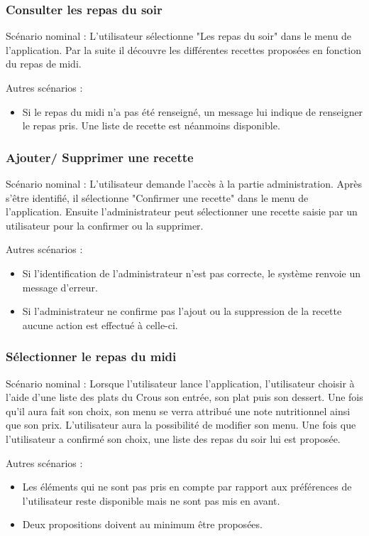 \subsubsection{Consulter les repas du soir} 

Scénario nominal :
L'utilisateur sélectionne "Les repas du soir" dans le menu de l'application. Par la suite il découvre les différentes recettes proposées en fonction du repas de midi.

Autres scénarios :
\begin{itemize}
\item Si le repas du midi n'a pas été renseigné, un message lui indique de renseigner le repas pris. Une liste de recette est néanmoins disponible.
\end{itemize}

\subsubsection{Ajouter/ Supprimer une recette} 

Scénario nominal :
L'utilisateur demande l'accès à la partie administration. Après s'être identifié, il sélectionne "Confirmer une recette" dans le menu de l'application. Ensuite l'administrateur peut sélectionner une recette saisie par un utilisateur pour la confirmer ou la supprimer.

Autres scénarios :
\begin{itemize}
\item Si l'identification de l'administrateur n'est pas correcte, le système renvoie un message d'erreur.
\item Si l'administrateur ne confirme pas l'ajout ou la suppression de la recette aucune action est effectué à celle-ci.
\end{itemize}


\subsubsection{Sélectionner le repas du midi} 


Scénario nominal :
Lorsque l'utilisateur lance l'application, l'utilisateur choisir à l'aide d'une liste des plats du Crous son entrée, son plat puis son dessert. Une fois qu'il aura fait son choix, son menu se verra attribué une note nutritionnel ainsi que son prix. L'utilisateur aura la possibilité de modifier son menu. Une fois que l'utilisateur a confirmé son choix, une liste des repas du soir lui est proposée.


Autres scénarios :
\begin{itemize}
\item Les éléments qui ne sont pas pris en compte par rapport aux préférences de l'utilisateur reste disponible mais ne sont pas mis en avant.
\item Deux propositions doivent au minimum être proposées.
\end{itemize}

